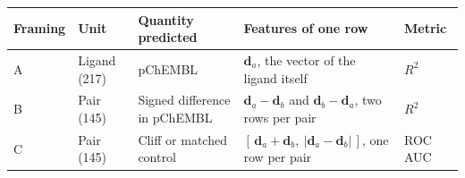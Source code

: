 \begin{tabular}{ll>{\raggedright\arraybackslash}p{3.2cm}>{\raggedright\arraybackslash}p{5.2cm}l}
\toprule
Framing & Unit & Quantity predicted & Features of one row & Metric \\
\midrule
A & Ligand (217) & pChEMBL & $\mathbf{d}_a$, the vector of the ligand itself & $R^2$ \\
B & Pair (145) & Signed difference in pChEMBL & $\mathbf{d}_a-\mathbf{d}_b$ and $\mathbf{d}_b-\mathbf{d}_a$, two rows per pair & $R^2$ \\
C & Pair (145) & Cliff or matched control & $[\,\mathbf{d}_a+\mathbf{d}_b,\ |\mathbf{d}_a-\mathbf{d}_b|\,]$, one row per pair & ROC AUC \\
\bottomrule
\end{tabular}

